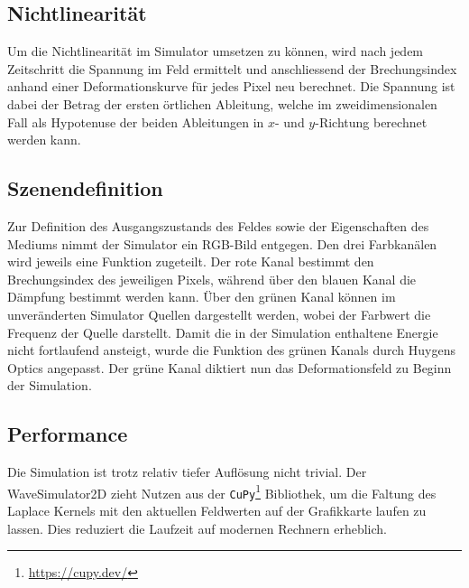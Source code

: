 \subsection{Nichtlinearität}
Um die Nichtlinearität im Simulator umsetzen zu können, wird nach jedem Zeitschritt die Spannung im Feld ermittelt und anschliessend der Brechungsindex anhand einer Deformationskurve für jedes Pixel neu berechnet.
Die Spannung ist dabei der Betrag der ersten örtlichen Ableitung, welche im zweidimensionalen Fall als Hypotenuse der beiden Ableitungen in $x$- und $y$-Richtung berechnet werden kann.

\subsection{Szenendefinition}
Zur Definition des Ausgangszustands des Feldes sowie der Eigenschaften des Mediums nimmt der Simulator ein RGB-Bild entgegen.
Den drei Farbkanälen wird jeweils eine Funktion zugeteilt.
Der rote Kanal bestimmt den Brechungsindex des jeweiligen Pixels, während über den blauen Kanal die Dämpfung bestimmt werden kann.
Über den grünen Kanal können im unveränderten Simulator Quellen dargestellt werden, wobei der Farbwert die Frequenz der Quelle darstellt.
Damit die in der Simulation enthaltene Energie nicht fortlaufend ansteigt, wurde die Funktion des grünen Kanals durch Huygens Optics angepasst.
Der grüne Kanal diktiert nun das Deformationsfeld zu Beginn der Simulation.

\subsection{Performance}
Die Simulation ist trotz relativ tiefer Auflösung nicht trivial. 
Der WaveSimulator2D zieht Nutzen aus der \texttt{CuPy}\footnote{\url{https://cupy.dev/}} Bibliothek, um die Faltung des Laplace Kernels mit den aktuellen Feldwerten auf der Grafikkarte laufen zu lassen.
Dies reduziert die Laufzeit auf modernen Rechnern erheblich.
